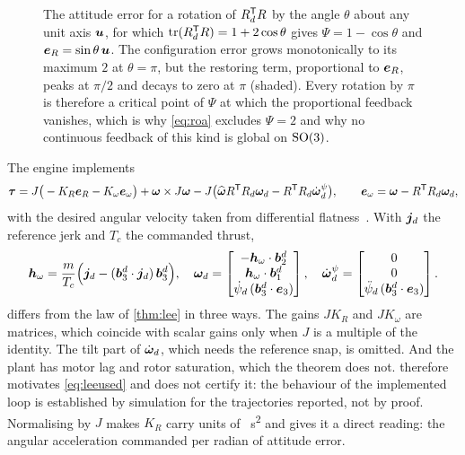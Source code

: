 \begin{figure}[tbp]
\centering

\caption{The attitude error for a rotation of $R_d^{\mathsf{T}} R$ by the angle
$\theta$ about any unit axis $\bm{u}$, for which $\operatorname{tr}(R_d^{\mathsf{T}} R)=1+2\cos\theta$
gives $\Psi=1-\cos\theta$ and $\bm{e}_R=\sin\theta\,\bm{u}$. The configuration
error grows monotonically to its maximum $2$ at $\theta=\pi$, but the restoring
term, proportional to $\bm{e}_R$, peaks at $\pi/2$ and decays to zero at $\pi$
(shaded). Every rotation by $\pi$ is therefore a critical point of $\Psi$ at
which the proportional feedback vanishes, which is why \cref{eq:roa} excludes
$\Psi=2$ and why no continuous feedback of this kind is global on $\mathrm{SO}(3)$.}
\label{fig:psi}
\end{figure}

The engine implements
\begin{equation}
  \bm{\tau} = J\big(-K_R\bm{e}_R - K_\omega\bm{e}_\omega\big)
              + \bm{\omega}\times J\bm{\omega}
              - J\big(\widehat{\bm{\omega}}R^{\mathsf{T}} R_d\bm{\omega}_d
                      - R^{\mathsf{T}} R_d\dot{\bm{\omega}}{}_d^{\psi}\big),
  \qquad
  \bm{e}_\omega = \bm{\omega} - R^{\mathsf{T}} R_d\bm{\omega}_d ,
  \label{eq:leeused}
\end{equation}
with the desired angular velocity taken from differential
flatness~\cite{mellinger2011}. With $\bm{j}_d$ the reference jerk and $T_c$ the
commanded thrust,
\begin{equation}
  \bm{h}_\omega = \frac{m}{T_c}\Big(\bm{j}_d
     - (\bm{b}_3^d\cdot\bm{j}_d)\,\bm{b}_3^d\Big),
  \quad
  \bm{\omega}_d = \begin{bmatrix}
     -\bm{h}_\omega\cdot\bm{b}_2^d\\ \bm{h}_\omega\cdot\bm{b}_1^d\\
     \dot{\psi}_d\,(\bm{b}_3^d\cdot\bm{e}_3) \end{bmatrix},
  \quad
  \dot{\bm{\omega}}{}_d^{\psi} = \begin{bmatrix} 0\\0\\
     \ddot{\psi}_d\,(\bm{b}_3^d\cdot\bm{e}_3)\end{bmatrix} .
  \label{eq:omegad}
\end{equation}
 differs from the law of \cref{thm:lee} in three ways. The
gains $JK_R$ and $JK_\omega$ are matrices, which coincide with scalar gains only
when $J$ is a multiple of the identity. The tilt part of $\dot{\bm{\omega}}_d$,
which needs the reference snap, is omitted. And the plant has motor lag and
rotor saturation, which the theorem does not.  therefore
motivates \cref{eq:leeused} and does not certify it: the behaviour of the
implemented loop is established by simulation for the trajectories reported,
not by proof. Normalising by $J$ makes $K_R$ carry units of
\si{\per\second\squared} and gives it a direct reading: the angular
acceleration commanded per radian of attitude error.

